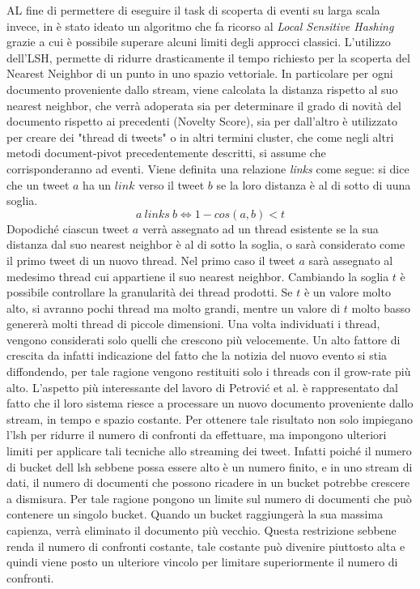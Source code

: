 AL fine di permettere di eseguire il task di scoperta di eventi su larga scala invece, in \cite{Petrovic:2010:SFS:1857999.1858020} è stato ideato un algoritmo che fa ricorso al \emph{Local Sensitive Hashing}\cite{Lsh}  grazie a cui è possibile superare alcuni limiti degli approcci classici.
L'utilizzo dell'LSH, permette di ridurre drasticamente il tempo richiesto per la scoperta del Nearest Neighbor di un punto in uno spazio vettoriale.
In particolare per ogni documento proveniente dallo stream, viene calcolata la distanza rispetto al suo nearest neighbor, che verrà adoperata sia per determinare il grado di novità del documento rispetto ai precedenti (Novelty Score), sia per dall'altro è utilizzato per creare dei "thread di tweets" o in altri termini cluster, che come negli altri metodi document-pivot precedentemente descritti, si assume che  corrisponderanno ad eventi. Viene definita una relazione \emph{links} come segue: si dice che un tweet   $a$ ha un $link$ verso il tweet $b$  se la loro distanza è al di sotto di uuna soglia.  
 \begin{equation}
  a \ links \ b \Longleftrightarrow 1-cos(a,b)<t
\end{equation}
Dopodiché ciascun tweet $a$  verrà  assegnato ad un thread esistente se la sua distanza dal suo nearest neighbor è al di sotto la soglia, o sarà considerato come il primo tweet di un nuovo thread. Nel primo caso il tweet $a$ sarà assegnato al medesimo thread cui appartiene il suo nearest neighbor. Cambiando la soglia $t$ 
è possibile controllare la granularità dei thread prodotti. Se $t$ è un valore molto alto, si avranno pochi thread ma molto grandi, mentre un valore di $t$ molto basso genererà molti thread di piccole dimensioni.
Una volta individuati i thread, vengono considerati solo quelli che crescono più velocemente. Un alto fattore di crescita da infatti indicazione del fatto che la notizia del nuovo evento si stia diffondendo,  per tale ragione vengono restituiti solo i threads con il grow-rate più alto. L'aspetto più interessante del lavoro di Petrovi\'c et al. \cite{Petrovic:2010:SFS:1857999.1858020} è rappresentato dal fatto che il loro sistema riesce a processare un nuovo documento proveniente dallo stream, in tempo e spazio costante.  Per ottenere tale risultato non solo impiegano l'lsh per ridurre il numero di confronti da effettuare, ma impongono ulteriori limiti per applicare tali tecniche allo streaming dei tweet. Infatti poiché il numero di bucket dell lsh sebbene possa essere alto è un numero finito, e in uno stream di dati, il numero di documenti che possono ricadere in un bucket potrebbe crescere a dismisura. Per tale ragione pongono un limite sul numero di documenti che può contenere un singolo bucket. Quando un bucket raggiungerà la sua massima capienza, verrà eliminato il documento più vecchio. Questa restrizione sebbene renda il numero di confronti costante, tale costante può divenire piuttosto alta e quindi viene posto un ulteriore vincolo per limitare superiormente il numero di confronti. 
